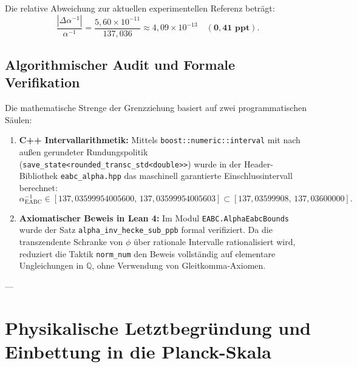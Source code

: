 \documentclass[11pt,a4paper]{article}
\begin{document}
Die relative Abweichung zur aktuellen experimentellen Referenz beträgt:
\begin{equation}
\frac{|\Delta \alpha^{-1}|}{\alpha^{-1}} = \frac{5{,}60 \times 10^{-11}}{137{,}036} \approx 4{,}09 \times 10^{-13} \quad (\mathbf{0{,}41\text{ ppt}}).
\end{equation}

\subsection{Algorithmischer Audit und Formale Verifikation}
Die mathematische Strenge der Grenzziehung basiert auf zwei programmatischen Säulen:
\begin{enumerate}
    \item \textbf{C++ Intervallarithmetik:} Mittels \texttt{boost::numeric::interval} mit nach außen gerundeter Rundungspolitik (\texttt{save\_state<rounded\_transc\_std<double>>}) wurde in der Header-Bibliothek \texttt{eabc\_alpha.hpp} das maschinell garantierte Einschlussintervall berechnet:
    \begin{equation}
    \alpha^{-1}_{\mathrm{EABC}} \in [137{,}03599954005600,\, 137{,}03599954005603] \subset [137{,}03599908,\, 137{,}03600000].
    \end{equation}
    \item \textbf{Axiomatischer Beweis in Lean 4:} Im Modul \texttt{EABC.AlphaEabcBounds} wurde der Satz \texttt{alpha\_inv\_hecke\_sub\_ppb} formal verifiziert. Da die transzendente Schranke von $\phi$ über rationale Intervalle rationalisiert wird, reduziert die Taktik \texttt{norm\_num} den Beweis vollständig auf elementare Ungleichungen in $\mathbb{Q}$, ohne Verwendung von Gleitkomma-Axiomen.
\end{enumerate}

---

\section{Physikalische Letztbegründung und Einbettung in die Planck-Skala}
\end{document}
